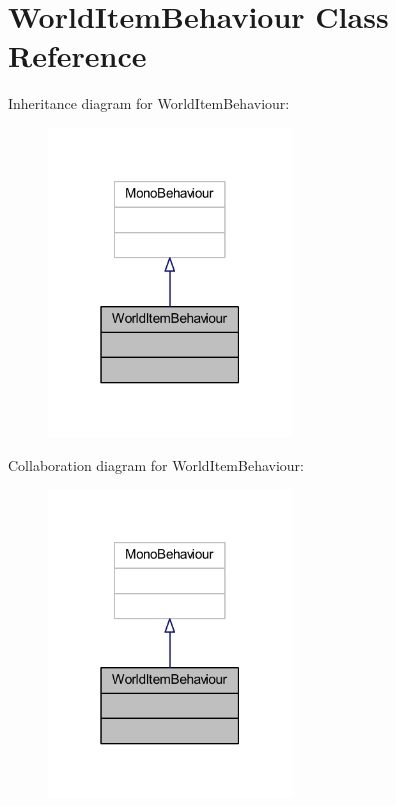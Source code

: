 \hypertarget{class_world_item_behaviour}{}\section{World\+Item\+Behaviour Class Reference}
\label{class_world_item_behaviour}


Inheritance diagram for World\+Item\+Behaviour\+:\nopagebreak
\begin{figure}[H]
\begin{center}
\leavevmode
\includegraphics[width=183pt]{class_world_item_behaviour__inherit__graph}
\end{center}
\end{figure}


Collaboration diagram for World\+Item\+Behaviour\+:\nopagebreak
\begin{figure}[H]
\begin{center}
\leavevmode
\includegraphics[width=183pt]{class_world_item_behaviour__coll__graph}
\end{center}
\end{figure}
